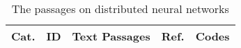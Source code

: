 \clearpage
\onecolumn

{\tiny
\begin{longtable}{|l|p{0.6cm}|p{11.8cm}|p{0.6cm}|p{2cm}|}
	\caption{The passages on distributed neural networks}\label{tab:dnn_passages}                                                                                                                                                                                                                                                                                                                                                                                                                                                              \\

	\toprule
	Cat. & \centering ID & Text Passages                                                                                                                                                                                                                                                                                                                                                                                                                                                                                              & Ref. & Codes \\
	\midrule
	\endfirsthead


\end{longtable}}
